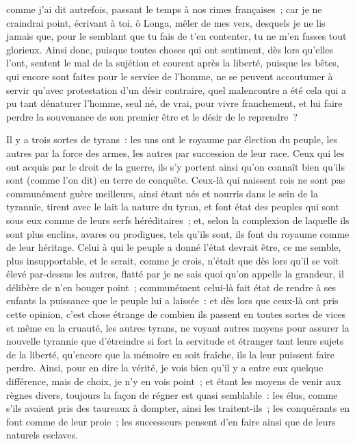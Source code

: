 \documentclass[french,twoside]{book} %
\begin{document}
\noindent comme j’ai dit autrefois, passant le temps à nos rimes françaises ; car je ne craindrai point, écrivant à toi, ô Longa, mêler de mes vers, desquels je ne lis jamais que, pour le semblant que tu fais de t’en contenter, tu ne m’en fasses tout glorieux. Ainsi donc, puisque toutes choses qui ont sentiment, dès lors qu’elles l’ont, sentent le mal de la sujétion et courent après la liberté, puisque les bêtes, qui encore sont faites pour le service de l’homme, ne se peuvent accoutumer à servir qu’avec protestation d’un désir contraire, quel malencontre a été cela qui a pu tant dénaturer l’homme, seul né, de vrai, pour vivre franchement, et lui faire perdre la souvenance de son premier être et le désir de le reprendre ?\par
Il y a trois sortes de tyrans : les uns ont le royaume par élection du peuple, les autres par la force des armes, les autres par succession de leur race. Ceux qui les ont acquis par le droit de la guerre, ils s’y portent ainsi qu’on connaît bien qu’ils sont (comme l’on dit) en terre de conquête. Ceux-là qui naissent rois ne sont pas communément guère meilleurs, ainsi étant nés et nourris dans le sein de la tyrannie, tirent avec le lait la nature du tyran, et font état des peuples qui sont sous eux comme de leurs serfs héréditaires ; et, selon la complexion de laquelle ils sont plus enclins, avares ou prodigues, tels qu’ils sont, ils font du royaume comme de leur héritage. Celui à qui le peuple a donné l’état devrait être, ce me semble, plus insupportable, et le serait, comme je crois, n’était que dès lors qu’il se voit élevé par-dessus les autres, flatté par je ne sais quoi qu’on appelle la grandeur, il délibère de n’en bouger point ; communément celui-là fait état de rendre à ses enfants la puissance que le peuple lui a laissée : et dès lors que ceux-là ont pris cette opinion, c’est chose étrange de combien ils passent en toutes sortes de vices et même en la cruauté, les autres tyrans, ne voyant autres moyens pour assurer la nouvelle tyrannie que d’étreindre si fort la servitude et étranger tant leurs sujets de la liberté, qu’encore que la mémoire en soit fraîche, ils la leur puissent faire perdre. Ainsi, pour en dire la vérité, je vois bien qu’il y a entre eux quelque différence, mais de choix, je n’y en vois point ; et étant les moyens de venir aux règnes divers, toujours la façon de régner est quasi semblable : les élus, comme s’ils avaient pris des taureaux à dompter, ainsi les traitent-ils ; les conquérants en font comme de leur proie ; les successeurs pensent d’en faire ainsi que de leurs naturels esclaves.\par
\end{document}
